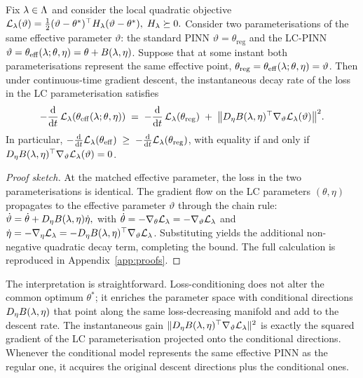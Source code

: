 \documentclass[12pt,a4paper]{extarticle}
\begin{document}
\begin{theorem}\label{thm:loss-decay}
Fix $\lambda \in \Lambda$ and consider the local quadratic objective
\(
    \mathcal{L}_\lambda(\vartheta) = \tfrac{1}{2} (\vartheta - \theta^*)^\top H_\lambda (\vartheta - \theta^*), \; H_\lambda \succeq 0.
\)
Consider two parameterisations of the same effective parameter $\vartheta$: the standard PINN $\vartheta = \theta_{\mathrm{reg}}$ and the LC-PINN $\vartheta = \theta_{\mathrm{eff}}(\lambda; \theta, \eta) = \theta + B(\lambda, \eta)$. Suppose that at some instant both parameterisations represent the same effective point, $\theta_{\mathrm{reg}} = \theta_{\mathrm{eff}}(\lambda; \theta, \eta) = \vartheta$. Then under continuous-time gradient descent, the instantaneous decay rate of the loss in the LC parameterisation satisfies
\begin{equation}
    -\frac{\mathrm{d}}{\mathrm{d} t}\, \mathcal{L}_\lambda(\theta_{\mathrm{eff}}(\lambda; \theta, \eta)) \;=\; -\frac{\mathrm{d}}{\mathrm{d} t}\, \mathcal{L}_\lambda(\theta_{\mathrm{reg}}) \;+\; \bigl\| D_\eta B(\lambda, \eta)^\top \nabla_\vartheta \mathcal{L}_\lambda(\vartheta) \bigr\|^2.
    \label{eq:loss-decay}
\end{equation}
In particular, $-\frac{\mathrm{d}}{\mathrm{d} t} \mathcal{L}_\lambda(\theta_{\mathrm{eff}}) \;\geq\; -\frac{\mathrm{d}}{\mathrm{d} t} \mathcal{L}_\lambda(\theta_{\mathrm{reg}})$, with equality if and only if $D_\eta B(\lambda, \eta)^\top \nabla_\vartheta \mathcal{L}_\lambda(\vartheta) = 0$.
\end{theorem}

\begin{proof}[Proof sketch]
At the matched effective parameter, the loss in the two parameterisations is identical. The gradient flow on the LC parameters $(\theta, \eta)$ propagates to the effective parameter $\vartheta$ through the chain rule:
\(
    \dot\vartheta = \dot\theta + D_\eta B(\lambda, \eta) \dot\eta,
\)
with $\dot\theta = -\nabla_\theta \mathcal{L}_\lambda = -\nabla_\vartheta \mathcal{L}_\lambda$ and $\dot\eta = -\nabla_\eta \mathcal{L}_\lambda = -D_\eta B(\lambda, \eta)^\top \nabla_\vartheta \mathcal{L}_\lambda$. Substituting yields the additional non-negative quadratic decay term, completing the bound. The full calculation is reproduced in Appendix~\ref{app:proofs}.
\end{proof}

The interpretation is straightforward. Loss-conditioning does not alter the common optimum $\theta^*$; it enriches the parameter space with conditional directions $D_\eta B(\lambda, \eta)$ that point along the same loss-decreasing manifold and add to the descent rate. The instantaneous gain $\| D_\eta B(\lambda, \eta)^\top \nabla_\vartheta \mathcal{L}_\lambda \|^2$ is exactly the squared gradient of the LC parameterisation projected onto the conditional directions. Whenever the conditional model represents the same effective PINN as the regular one, it acquires the original descent directions plus the conditional ones.
\end{document}
